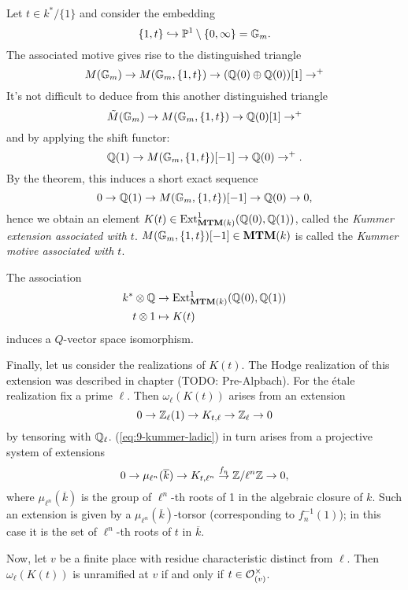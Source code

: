 \begin{exam}
  Let $t \in k^* / \{ 1 \}$ and consider the embedding
  \begin{equation*}
    \{ 1,t \} \hookrightarrow \mathbb{P}^1 \setminus \{0, \infty\}=\mathbb{G}_m.
  \end{equation*}
  The associated motive gives rise to the distinguished triangle
  \begin{equation*}
    M(\mathbb{G}_m)\to M(\mathbb{G}_m,\{1,t\})\to (\mathbb{Q}(0)\oplus\mathbb{Q}(0))[1]\to^{+}
  \end{equation*}
  It's not difficult to deduce from this another distinguished triangle
  \begin{equation*}
    \tilde{M}(\mathbb{G}_m)\to M(\mathbb{G}_m,\{1,t\})\to \mathbb{Q}(0)[1]\to^{+}
  \end{equation*}%
  and by applying the shift functor:
  \begin{equation*}
    \mathbb{Q}(1)\to M(\mathbb{G}_m,\{1,t\})[-1]\to \mathbb{Q}(0)\to^{+}.
  \end{equation*}
  By the theorem, this induces a short exact sequence
  \begin{equation*}
    0\to\mathbb{Q}(1)\to M(\mathbb{G}_m,\{1,t\})[-1]\to \mathbb{Q}(0)\to 0,
  \end{equation*}
  hence we obtain an element $K(t)\in\mathrm{Ext}^1_{\mathbf{MTM}(k)}(\mathbb{Q}(0), \mathbb{Q}(1))$,
  called the \emph{Kummer extension associated with
    $t$}. $M(\mathbb{G}_m,\{1,t\})[-1]\in\mathbf{MTM}(k)$ is called the \emph{Kummer
    motive associated with $t$}.

  The association
  \begin{align*}
    k^{*}\otimes \mathbb{Q}&\to \mathrm{Ext}^{1}_{\mathbf{MTM}(k)}(\mathbb{Q}(0),\mathbb{Q}(1))\\
    t\otimes 1&\mapsto K(t)\\
  \end{align*}
  induces a $Q$-vector space isomorphism.

  Finally, let us consider the realizations of $K(t)$. The Hodge
  realization of this extension was described in chapter (TODO:
  Pre-Alpbach). For the étale realization fix a prime $\ell$. Then
  $\omega_{\ell}(K(t))$ arises from an extension
  \begin{equation}
    0\to \mathbb{Z}_{\ell}(1)\to K_{t,\ell}\to \mathbb{Z}_{\ell}\to 0\label{eq:9-kummer-ladic}
  \end{equation}
  by tensoring with $\mathbb{Q}_{\ell}$. (\ref{eq:9-kummer-ladic}) in turn
  arises from a projective system of extensions
  \begin{equation*}
    0\to \mu_{\ell^{n}}(\overline{k})\to K_{t,\ell^{n}}\stackrel{f_{n}}{\to} \mathbb{Z}/\ell^{n}\mathbb{Z}\to 0,
  \end{equation*}
  where $\mu_{\ell^{n}}(\overline{k})$ is the group of $\ell^{n}$-th
  roots of 1 in the algebraic closure of $k$. Such an extension is
  given by a $\mu_{\ell^{n}}(\overline{k})$-torsor (corresponding to
  $f_{n}^{-1}(1)$); in this case it is the set of $\ell^{n}$-th roots
  of $t$ in $\overline{k}$.

  Now, let $v$ be a finite place with residue characteristic distinct
  from $\ell$. Then $\omega_{\ell}(K(t))$ is unramified at $v$ if and
  only if $t\in {\cal O}_{(v)}^{\times}$.
\end{exam}

